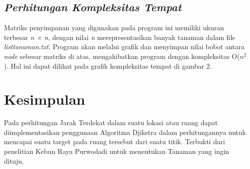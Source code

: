 \documentclass[conference]{IEEEtran}
\begin{document}
\subsection{\textit{Perhitungan Kompleksitas Tempat}}
Matriks penyimpanan yang digunakan pada program ini
memiliki ukuran terbesar \textit{n × n}, dengan nilai \textit{n} merepresentasikan banyak tanaman dalam file \textit{listtanaman.txt}. Program
akan melalui grafik dan menyimpan nilai bobot antara \textit{node}
sebesar matriks di atas, mengakibatkan program dengan kompleksitas O($n^{2}$). Hal ini dapat dilihat pada grafik kompleksitas
tempat di gambar 2.

\section{Kesimpulan}
Pada perhitungan Jarak Terdekat dalam suatu lokasi atau ruang dapat diimplementasikan penggunaan Algoritma Djikstra
dalam perhitungannya untuk mencapai suatu target pada ruang
tersebut dari suatu titik. Terbukti dari penelitian Kebun Raya
Purwodadi untuk menentukan Tanaman yang ingin dituju.



\end{document}
